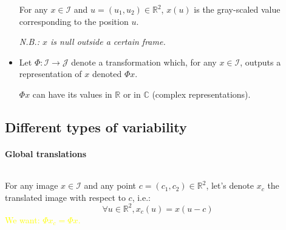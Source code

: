 \documentclass[10pt]{beamer}
\newcommand{\mathR}{\mathbb{R}}
\newcommand{\mathC}{\mathbb{C}}
\newcommand{\MI}{{\mathcal I}}
\newcommand{\MJ}{{\mathcal J}}
\newcommand{\col}{\textcolor{yellow}}
\begin{document}
\begin{darkframes}
\begin{frame}[label=not]{\subsecname}
\begin{itemize}
        For any $x \in \MI$ and $u = (u_1, u_2) \in \mathR^2$, $x(u)$ is the gray-scaled value corresponding to the position $u$.
        
        \emph{N.B.: $x$ is null outside a certain frame.}
        
        \item Let $\Phi: \MI \rightarrow \MJ$ denote a transformation which, for any $x \in \MI$, outputs a representation of $x$ denoted $\Phi x$.
        
        $\Phi x$ can have its values in $\mathR$ or in $\mathC$ (complex representations).
    \end{itemize}
    
    \end{frame}
    
    \subsection{Different types of variability}
    
    \begin{frame}[label=transl]{\subsecname}
    \framesubtitle{Global translations}
    
    \begin{columns}
    
        For any image $x \in \MI$ and any point $c = (c_1, c_2) \in \mathR^2$, let's denote $x_c$ the translated image with respect to $c$, i.e.:
        $$\forall u \in \mathR^2, x_c(u) = x(u-c)$$
        \col{We want: $\Phi x_c = \Phi x$.}
    
        

\end{columns}
\end{frame}
\end{darkframes}
\end{document}
